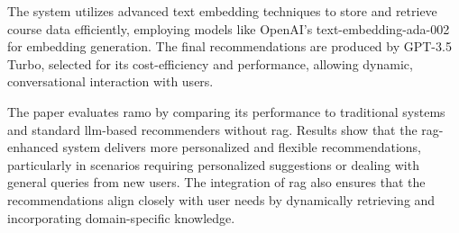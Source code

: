 The system utilizes advanced text embedding techniques to store and retrieve course data efficiently, employing models like OpenAI's text-embedding-ada-002 for embedding generation.
The final recommendations are produced by GPT-3.5 Turbo, selected for its cost-efficiency and performance, allowing dynamic, conversational interaction with users.

The paper evaluates \gls{ramo} by comparing its performance to traditional systems and standard \gls{llm}-based recommenders without \gls{rag}.
Results show that the \gls{rag}-enhanced system delivers more personalized and flexible recommendations, particularly in scenarios requiring personalized suggestions or dealing with general queries from new users.
The integration of \gls{rag} also ensures that the recommendations align closely with user needs by dynamically retrieving and incorporating domain-specific knowledge.